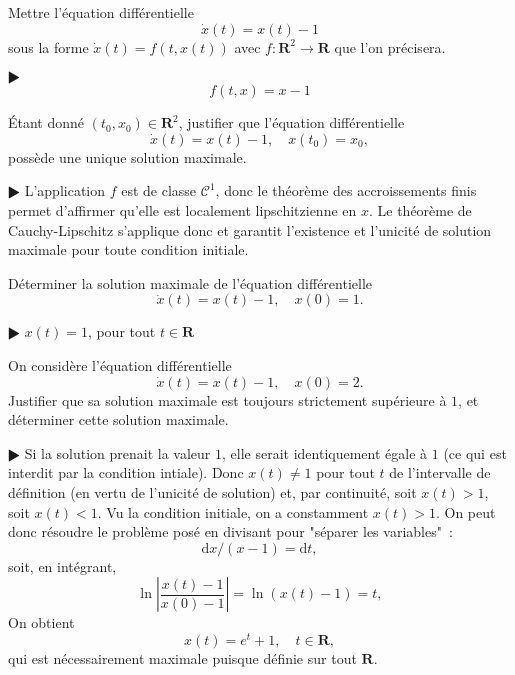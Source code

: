 \documentclass[11pt,a4paper]{article}
\def\R{\mathbf{R}}
\def\CC{\mathscr{C}}
\def\d{\mathrm{d}}
\theoremstyle{plain}
\theoremstyle{definition}
\begin{document}
\begin{Exercice}[6 points]
\begin{Question} 
Mettre l'\'equation diff\'erentielle
\[ \dot{x}(t)=x(t)-1 \]
sous la forme $\dot{x}(t)=f(t,x(t))$ avec $f:\R^2 \to \R$ que l'on pr\'ecisera.
\end{Question}

\begin{corr} $\RHD$ 
\[ f(t,x) = x-1 \]
\end{corr}

\begin{Question}
\'Etant donn\'e $(t_0,x_0) \in \R^2$,
justifier que l'\'equation diff\'erentielle
\[ \dot{x}(t)=x(t)-1,\quad x(t_0)=x_0, \]
poss\`ede une unique solution maximale. 
\end{Question}

\begin{corr} $\RHD$ L'application $f$ est 
de classe $\CC^1$, donc le th\'eor\`eme des accroissements finis permet d'affirmer
qu'elle est localement lipschitzienne en $x$. Le th\'eor\`eme de Cauchy-Lipschitz
s'applique donc et garantit l'existence et l'unicit\'e de solution maximale pour toute
condition initiale.
\end{corr}

\begin{Question} D\'eterminer la solution maximale de l'\'equation diff\'erentielle
\[ \dot{x}(t)=x(t)-1,\quad x(0)=1. \]
\end{Question}

\begin{corr} $\RHD$ $x(t)=1$, pour tout $t \in \R$
\end{corr}

\begin{Question} On consid\`ere l'\'equation diff\'erentielle
\[ \dot{x}(t)=x(t)-1,\quad x(0)=2. \]
Justifier que sa solution maximale est toujours strictement sup\'erieure \`a $1$,
et d\'eterminer cette solution maximale.
\end{Question}

\begin{corr} $\RHD$ Si la solution prenait la valeur $1$, elle serait identiquement
\'egale \`a $1$ (ce qui est interdit par la condition intiale). Donc $x(t) \neq 1$
pour tout $t$ de l'intervalle de d\'efinition
(en vertu de l'unicit\'e de solution) et, par continuit\'e,
soit $x(t)>1$, soit $x(t)<1$. Vu la condition initiale, on a constamment $x(t)>1$.
On peut donc
r\'esoudre le probl\`eme pos\'e en divisant pour "s\'eparer les variables"~:
\[ \d x/(x-1) = \d t, \]
soit, en int\'egrant,
\[ \ln\left| \frac{x(t)-1}{x(0)-1} \right| = \ln(x(t)-1) = t, \]
On obtient
\[ x(t) = e^t+1,\quad t \in \R, \]
qui est n\'ecessairement maximale
puisque d\'efinie sur tout $\R$.
\end{corr}
\end{Exercice}
\end{document}
